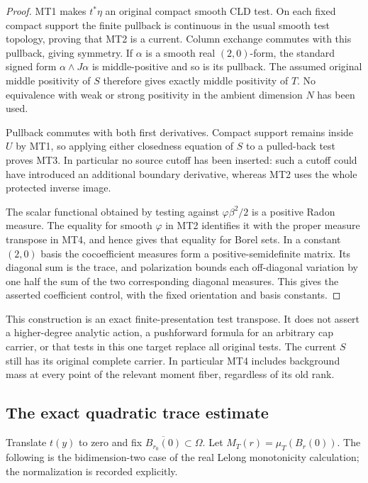 \begin{proof}
MT1 makes \(t^*\eta\) an original compact smooth CLD
test.  On each fixed compact support the finite pullback
is continuous in the usual smooth test topology, proving
that MT2 is a current.  Column exchange commutes with
this pullback, giving symmetry.  If \(\alpha\) is a
smooth real \((2,0)\)-form, the standard signed form
\(\alpha\wedge J\alpha\) is middle-positive and so is
its pullback.  The assumed original middle positivity
of \(S\) therefore gives exactly middle positivity of
\(T\).  No equivalence with weak or strong positivity
in the ambient dimension \(N\) has been used.

Pullback commutes with both first derivatives.  Compact
support remains inside \(U\) by MT1, so applying either
closedness equation of \(S\) to a pulled-back test proves
MT3.  In particular no source cutoff has been inserted:
such a cutoff could have introduced an additional boundary
derivative, whereas MT2 uses the whole protected inverse
image.

The scalar functional obtained by testing against
\(\varphi\beta^2/2\) is a positive Radon measure.
The equality for smooth \(\varphi\) in MT2 identifies
it with the proper measure transpose in MT4, and hence
gives that equality for Borel sets.  In a constant
\((2,0)\) basis the cocoefficient measures form a
positive-semidefinite matrix.  Its diagonal sum is the
trace, and polarization bounds each off-diagonal
variation by one half the sum of the two corresponding
diagonal measures.  This gives the asserted coefficient
control, with the fixed orientation and basis constants.
\end{proof}

This construction is an exact finite-presentation test
transpose.  It does not assert a higher-degree analytic
action, a pushforward formula for an arbitrary cap carrier,
or that tests in this one target replace all original tests.
The current \(S\) still has its original complete carrier.
In particular MT4 includes background mass at every point
of the relevant moment fiber, regardless of its old rank.

\subsection{The exact quadratic trace estimate}

Translate \(t(y)\) to zero and fix
\(\overline{B_{r_0}(0)}\subset\Omega\).  Let
\(M_T(r)=\mu_T(B_r(0))\).  The following is the
bidimension-two case of the real Lelong monotonicity
calculation; the normalization is recorded explicitly.

